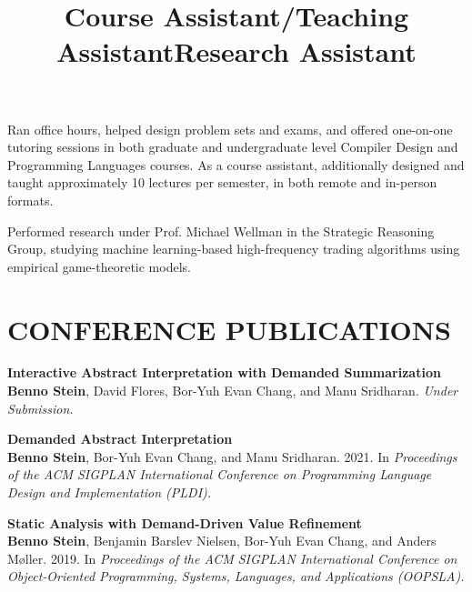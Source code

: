 \documentclass[margin,10pt]{res}
\begin{document}
\begin{resume}
\title{\textbf{Course Assistant}/\textbf{Teaching Assistant}}
\begin{position}
  Ran office hours, helped design problem sets and exams, and offered one-on-one tutoring sessions in both graduate and undergraduate level Compiler Design and Programming Languages courses.
  As a course assistant, additionally designed and taught approximately 10 lectures per semester, in both remote and in-person formats.
  \end{position}

\title{\textbf{Research Assistant}}
\begin{position}
Performed research under Prof. Michael Wellman in the Strategic Reasoning Group, studying machine learning-based high-frequency trading algorithms using empirical game-theoretic models.\end{position}

\section{CONFERENCE PUBLICATIONS}
{\bf Interactive Abstract Interpretation with Demanded Summarization}\\
{\bf Benno Stein}, David Flores, Bor-Yuh Evan Chang, and Manu Sridharan.  {\em Under Submission.}\\\vspace{-1em}

{\bf Demanded Abstract Interpretation}\\
{\bf Benno Stein}, Bor-Yuh Evan Chang, and Manu Sridharan.  2021. In {\em Proceedings of the ACM SIGPLAN International Conference on Programming Language Design and Implementation (PLDI).}\\\vspace{-1em}

{\bf Static Analysis with Demand-Driven Value Refinement}\\
{\bf Benno Stein}, Benjamin Barslev Nielsen, Bor-Yuh Evan Chang, and Anders M\o{}ller. 2019. In {\em Proceedings of  the ACM SIGPLAN International Conference on Object-Oriented Programming, Systems, Languages, and Applications (OOPSLA).}\\\vspace{-1em}


\end{resume}
\end{document}
